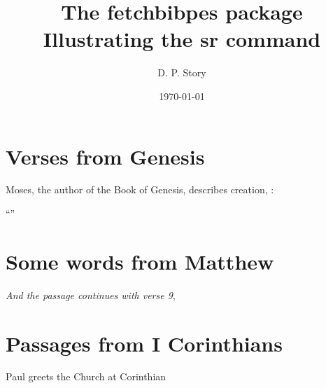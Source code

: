 \documentclass{article}
\title{The \textsf{fetchbibpes} package\\[3pt]Illustrating the \textsf{sr} command}
\author{D. P. Story}
\date{\today}
\begin{document}
\maketitle

\tableofcontents

\section{Verses from Genesis}

   Moses, the author of the Book of Genesis, describes creation, : 
   
    ``''

\section{Some words from Matthew}

     
    \emph{And the passage continues with verse 9}, 


\section{Passages from I Corinthians}

Paul greets the Church at Corinthian  


    \newpage
    \printindex
\end{document}
